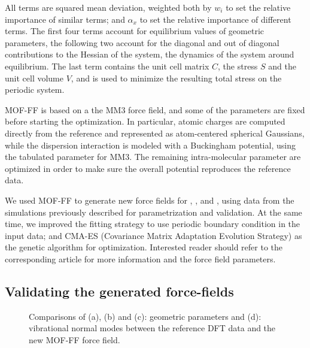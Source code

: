 \documentclass[thesis]{subfiles}
\begin{document}
All terms are squared mean deviation, weighted both by $w_i$ to set the relative
importance of similar terms; and $\alpha_x$ to set the relative importance of
different terms. The first four terms account for equilibrium values of
geometric parameters, the following two account for the diagonal and out of
diagonal contributions to the Hessian of the system, \ie the dynamics of the
system around equilibrium. The last term contains the unit cell matrix $C$, the
stress $S$ and the unit cell volume $V$, and is used to minimize the resulting
total stress on the periodic system.

MOF-FF is based on a the MM3 force field\cite{Allinger1989}, and some of the
parameters are fixed before starting the optimization. In particular, atomic
charges are computed directly from the \abinitio reference and represented as
atom-centered spherical Gaussians, while the dispersion interaction is modeled
with a Buckingham potential, using the tabulated parameter for
MM3\cite{Allinger1994}. The remaining intra-molecular parameter are optimized in
order to make sure the overall potential reproduces the reference data.

We used MOF-FF to generate new force fields for , \ZIFCl, and \ZIFBr,
using data from the simulations previously described for parametrization and
validation. At the same time, we improved the fitting strategy to use periodic
boundary condition in the \abinitio input data; and CMA-ES (Covariance Matrix
Adaptation Evolution Strategy) as the genetic algorithm for optimization.
Interested reader should refer to the corresponding article\cite{DuerholtXXXX}
for more information and the force field parameters.

\subsection{Validating the generated force-fields}

\begin{figure}[t]
    \centering
    
    \caption{Comparisons of (a), (b) and (c): geometric parameters and (d):
    vibrational normal modes between the reference DFT data and the new MOF-FF
    force field.}
    \label{fig:fig:mof-ff:validation}
\end{figure}
\end{document}
